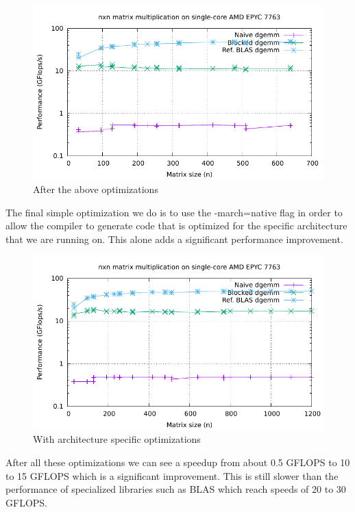 \documentclass[unicode,11pt,a4paper,oneside,numbers=endperiod,openany]{scrartcl}
\begin{document}
\begin{figure}[H]
    \centering
    \includegraphics[width=0.7\linewidth]{timing_no_march.pdf}
    \caption{After the above optimizations}
    \label{fig:image}
\end{figure}

The final simple optimization we do is to use the -march=native flag in order to allow the compiler to generate code that is optimized for the specific architecture that we are running on.
This alone adds a significant performance improvement.

\begin{figure}[H]
    \centering
    \includegraphics[width=0.7\linewidth]{timing_all.pdf}
    \caption{With architecture specific optimizations}
    \label{fig:image}
\end{figure}

After all these optimizations we can see a speedup from about 0.5 GFLOPS to 10 to 15 GFLOPS which is a significant improvement.
This is still slower than the performance of specialized libraries such as BLAS which reach speeds of 20 to 30 GFLOPS.
\end{document}
